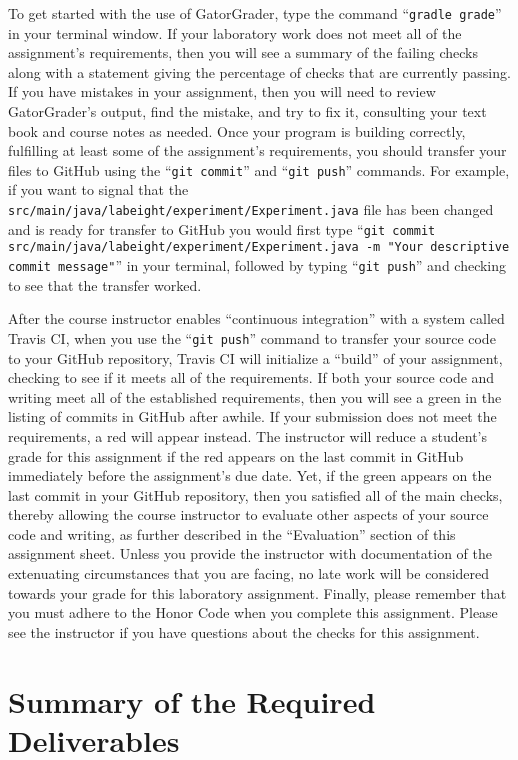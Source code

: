 \documentclass[11pt]{article}
\newcommand{\mainprogramsource}{\lstinline{src/main/java/labeight/experiment/Experiment.java}}
\newcommand{\gatorgraderstart}{\command{gradle grade}}
\newcommand{\gitcommit}{\command{git commit}}
\newcommand{\gitpush}{\command{git push}}
\newcommand{\gitcommitmainprogram}{\command{git commit src/main/java/labeight/experiment/Experiment.java -m "Your
descriptive commit message"}}
\newcommand{\command}[1]{``\lstinline{#1}''}
\newcommand{\step}[1]{``{#1}''}
\newcommand{\checkmark}{\ding{51}}
\newcommand{\naughtmark}{\ding{55}}
\begin{document}
To get started with the use of GatorGrader, type the command \gatorgraderstart{}
in your terminal window. If your laboratory work does not meet all of the
assignment's requirements, then you will see a summary of the failing checks
along with a statement giving the percentage of checks that are currently
passing. If you have mistakes in your assignment, then you will need to review
GatorGrader's output, find the mistake, and try to fix it, consulting your text
book and course notes as needed. Once your program is building correctly,
fulfilling at least some of the assignment's requirements, you should transfer
your files to GitHub using the \gitcommit{} and \gitpush{} commands. For
example, if you want to signal that the \mainprogramsource{} file has been
changed and is ready for transfer to GitHub you would first type
\gitcommitmainprogram{} in your terminal, followed by typing \gitpush{} and
checking to see that the transfer worked.

After the course instructor enables \step{continuous integration} with a system
called Travis CI, when you use the \gitpush{} command to transfer your source
code to your GitHub repository, Travis CI will initialize a \step{build} of your
assignment, checking to see if it meets all of the requirements. If both your
source code and writing meet all of the established requirements, then you will
see a green \checkmark{} in the listing of commits in GitHub after awhile. If
your submission does not meet the requirements, a red \naughtmark{} will appear
instead. The instructor will reduce a student's grade for this assignment if the
red \naughtmark{} appears on the last commit in GitHub immediately before the
assignment's due date. Yet, if the green \checkmark{} appears on the last commit
in your GitHub repository, then you satisfied all of the main checks, thereby
allowing the course instructor to evaluate other aspects of your source code and
writing, as further described in the \step{Evaluation} section of this
assignment sheet. Unless you provide the instructor with documentation of the
extenuating circumstances that you are facing, no late work will be considered
towards your grade for this laboratory assignment. Finally, please remember that
you must adhere to the Honor Code when you complete this assignment. Please see
the instructor if you have questions about the checks for this assignment.

\section*{Summary of the Required Deliverables}
\end{document}
